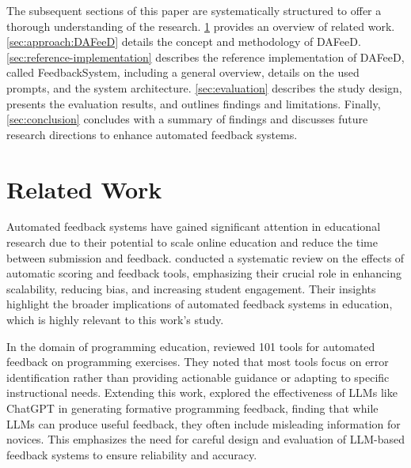 \documentclass[sigconf,screen,review,anonymous]{acmart}
\begin{document}
The subsequent sections of this paper are systematically structured to offer a thorough understanding of the research.
\cref{sec:related-work} provides an overview of related work. 
\cref{sec:approach:DAFeeD} details the concept and methodology of DAFeeD.
\cref{sec:reference-implementation} describes the reference implementation of DAFeeD, called FeedbackSystem, including a general overview, details on the used prompts, and the system architecture. 
\cref{sec:evaluation} describes the study design, presents the evaluation results, and outlines findings and limitations. 
Finally, \cref{sec:conclusion} concludes with a summary of findings and discusses future research directions to enhance automated feedback systems.

\section{Related Work} %
\label{sec:related-work}

Automated feedback systems have gained significant attention in educational research due to their potential to scale online education and reduce the time between submission and feedback.
\citet{hahn:2021:SystematicReviewEffects} conducted a systematic review on the effects of automatic scoring and feedback tools, emphasizing their crucial role in enhancing scalability, reducing bias, and increasing student engagement.
Their insights highlight the broader implications of automated feedback systems in education, which is highly relevant to this work's study.


%
In the domain of programming education, \citet{keuning:2018:SystematicLiteratureReview} reviewed 101 tools for automated feedback on programming exercises.
They noted that most tools focus on error identification rather than providing actionable guidance or adapting to specific instructional needs.
Extending this work, \citet{kiesler:2023:ExploringPotentialLarge} explored the effectiveness of LLMs like ChatGPT in generating formative programming feedback, finding that while LLMs can produce useful feedback, they often include misleading information for novices.
This emphasizes the need for careful design and evaluation of LLM-based feedback systems to ensure reliability and accuracy.
\end{document}

